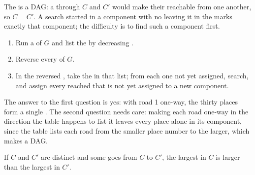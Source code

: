 The  is a DAG: a  through $C$ and $C'$ would make their  reachable from one another, so
$C = C'$. A search started in a component with no  leaving it in the  marks exactly that component;
the difficulty is to find such a component first.

\begin{method}\label{met:b1:graph-traversals:kosaraju}
\begin{enumerate}
\item Run a  of $G$ and list the  by decreasing .
\item Reverse every  of $G$.
\item In the reversed , take the  in that list; from each one not yet assigned, search, and assign every
 reached that is not yet assigned to a new component.
\end{enumerate}
\end{method}

\label{lst:b1:graph-traversals:kosaraju}

\label{out:b1:graph-traversals:kosaraju}

The answer to the first question is yes: with road 1 one-way, the thirty places form a single . The second question needs care: making each road one-way in the direction the table happens to list it
leaves every place alone in its component, since the table lists each road from the smaller place number to the
larger, which makes a DAG.

\begin{lemma}\label{lem:b1:graph-traversals:finish}
If $C$ and $C'$ are distinct  and some  goes from $C$ to $C'$, the largest  in $C$ is larger than the largest in $C'$.
\end{lemma}

